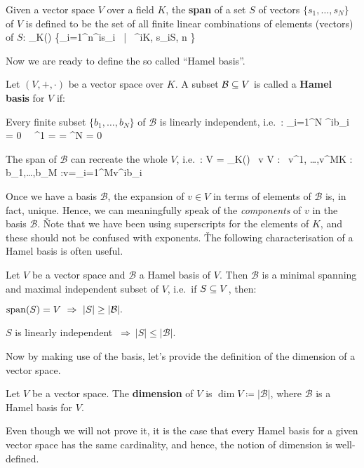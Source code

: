 \bd [Span]
Given a vector space $V$ over a field $K$, the \textbf{span} of a set $S$ of vectors $\{s_1,\ldots,s_N\}$ of $V$ is
defined to be the set of all finite linear combinations of elements (vectors) of $S$:
\bse
\lspan_K() \coloneqq \bigg\{\sum_{i=1}^n\lambda^is_i \ \Big| \ \lambda^i\in K, s_i\in S, n \bigg\}
\ese
\ed

Now we are ready to define the so called ``Hamel basis''.

Let $(V,+,\cdot)$ be a vector space over $K$. A subset $\mathcal{B}\subseteq V$ is called a \textbf{Hamel basis} for $V$ if:
\bit
\item Every finite subset $\{b_1,\ldots,b_N\}$ of $\mathcal{B}$ is linearly independent, i.e.\ :
\bse
\sum_{i=1}^N \lambda^ib_i = 0 \ \imp \ \lambda^1 = \cdots = \lambda^N = 0
\ese

\item The span of $\mathcal{B}$ can recreate the whole $V$, i.e.\ :
\bse
V = \lspan_K() \implies \forall \, v \in V : \exists \, v^1, \ldots,v^M\in K :
\exists \, b_1,\ldots,b_M \in {}:v=\ds \sum_{i=1}^Mv^ib_i
\ese
\eit
\ed

Once we have a basis $\mathcal{B}$, the expansion of $v\in V$ in terms of elements of $\mathcal{B}$ is, in fact,
unique. Hence, we can meaningfully speak of the \emph{components} of $v$ in the basis $\mathcal{B}$. \v

Note that we have been using superscripts for the elements of $K$, and these should not be confused with exponents. \v

The following characterisation of a Hamel basis is often useful.

\bt[]
Let $V$ be a vector space and $\mathcal{B}$ a Hamel basis of $V$. Then $\mathcal{B}$ is a minimal spanning and
maximal independent subset of $V$, i.e.\ if $S\subseteq V$, then:
\bit \item $\operatorname{span}(S) = V\ \Rightarrow \ |S| \geq |\mathcal{B}|.$
\item $S$ is linearly independent $\ \Rightarrow\ |S| \leq |\mathcal{B}|.$
\eit
\et

Now by making use of the basis, let's provide the definition of the dimension of a vector space.

Let $V$ be a vector space. The \textbf{dimension} of $V$ is $\dim V \coloneqq |\mathcal{B}|$, where $\mathcal{B}$ is
a Hamel basis for $V$.
\ed

Even though we will not prove it, it is the case that every Hamel basis for a given vector space has the same
cardinality, and hence, the notion of dimension is well-defined.


